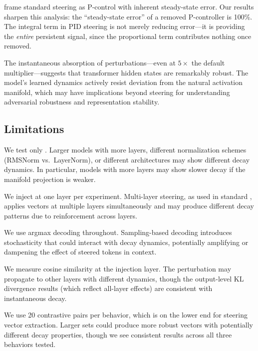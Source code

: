 \citet{nguyen2025pid} frame standard steering as P-control with inherent
steady-state error. Our results sharpen this analysis: the ``steady-state error''
of a removed P-controller is 100\%. The integral term in PID steering is not
merely reducing error---it is providing the \emph{entire} persistent signal,
since the proportional term contributes nothing once removed.

The instantaneous absorption of perturbations---even at $5\times$ the default
multiplier---suggests that transformer hidden states are remarkably robust. The
model's learned dynamics actively resist deviation from the natural activation
manifold, which may have implications beyond steering for understanding
adversarial robustness and representation stability.

\subsection{Limitations}

We test only \gptxl. Larger models with more layers, different normalization
schemes (RMSNorm vs.\ LayerNorm), or different architectures may show different
decay dynamics. In particular, models with more layers may show slower decay
if the manifold projection is weaker.

We inject at one layer per experiment. Multi-layer steering, as used in standard
\caa, applies vectors at multiple layers simultaneously and may produce
different decay patterns due to reinforcement across layers.

We use argmax decoding throughout. Sampling-based decoding introduces
stochasticity that could interact with decay dynamics, potentially amplifying
or dampening the effect of steered tokens in context.

We measure cosine similarity at the injection layer. The perturbation may
propagate to other layers with different dynamics, though the output-level KL
divergence results (which reflect all-layer effects) are consistent with
instantaneous decay.

We use 20 contrastive pairs per behavior, which is on the lower end for steering
vector extraction. Larger sets could produce more robust vectors with
potentially different decay properties, though we see consistent results across
all three behaviors tested.
